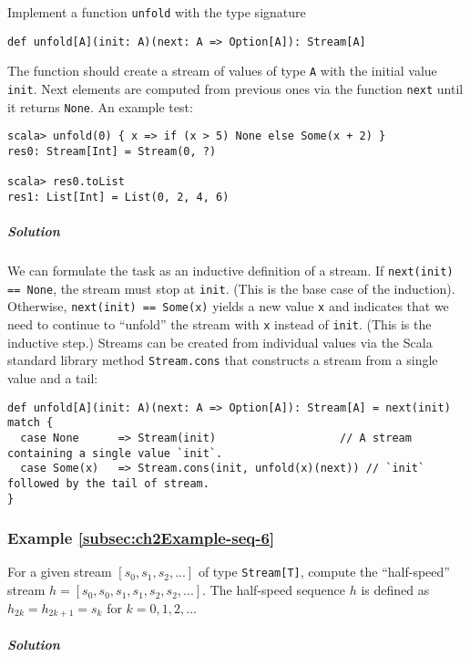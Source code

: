 Implement a function
\lstinline!unfold! with the type signature
\begin{lstlisting}
def unfold[A](init: A)(next: A => Option[A]): Stream[A]
\end{lstlisting}
The function should create a stream of values of type \lstinline!A!
with the initial value \lstinline!init!. Next elements are computed
from previous ones via the function \lstinline!next! until it returns
\lstinline!None!. An example test:
\begin{lstlisting}
scala> unfold(0) { x => if (x > 5) None else Some(x + 2) }
res0: Stream[Int] = Stream(0, ?)

scala> res0.toList
res1: List[Int] = List(0, 2, 4, 6)
\end{lstlisting}


\subparagraph{Solution}

We can formulate the task as an inductive definition of a stream.
If \lstinline!next(init) == None!, the stream must stop at \lstinline!init!.
(This is the base case of the induction). Otherwise, \lstinline!next(init) == Some(x)!
yields a new value \lstinline!x! and indicates that we need to continue
to ``unfold'' the stream with \lstinline!x! instead of \lstinline!init!.
(This is the inductive step.) Streams can be created from individual
values via the Scala standard library method \lstinline!Stream.cons!
that constructs a stream from a single value and a tail:
\begin{lstlisting}
def unfold[A](init: A)(next: A => Option[A]): Stream[A] = next(init) match {
  case None      => Stream(init)                   // A stream containing a single value `init`.
  case Some(x)   => Stream.cons(init, unfold(x)(next)) // `init` followed by the tail of stream.
}
\end{lstlisting}


\subsubsection{Example \label{subsec:ch2Example-seq-6}\ref{subsec:ch2Example-seq-6}}

For a given stream $\left[s_{0},s_{1},s_{2},...\right]$ of type \lstinline!Stream[T]!,
compute the ``half-speed'' stream $h=\left[s_{0},s_{0},s_{1},s_{1},s_{2},s_{2},...\right]$.
The half-speed sequence $h$ is defined as $h_{2k}=h_{2k+1}=s_{k}$
for $k=0,1,2,...$

\subparagraph{Solution}

